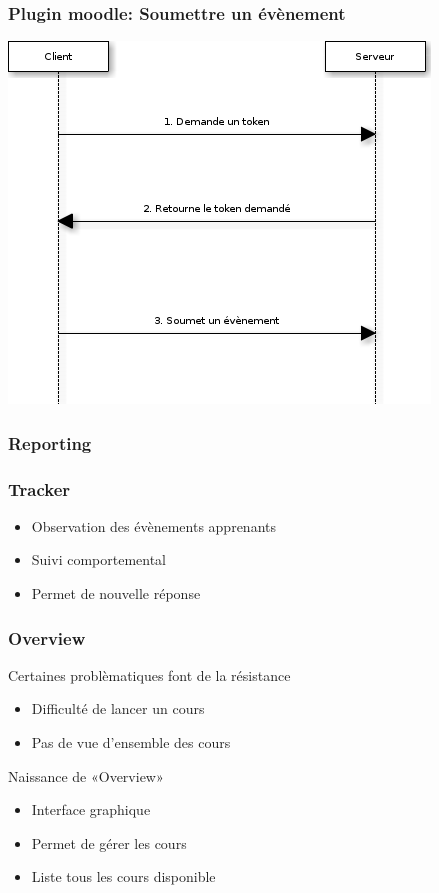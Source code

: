 \documentclass[10pt, compress]{beamer}
\begin{document}
\begin{frame}[fragile]
  \frametitle{Plugin moodle: Soumettre un évènement}
  \begin{center}
    \includegraphics[scale = 0.5]{../french/mem-seq-submit-event.png}
  \end{center}
\end{frame}

\begin{frame}[fragile]
  \frametitle{Reporting}
  \begin{center}

   \end{center}
\end{frame}

\begin{frame}[fragile]
  \frametitle{Tracker}
  \begin{center}
    \begin{itemize}[<+- | alert@+>]
      \item Observation des évènements apprenants
      \item Suivi comportemental
      \item Permet de nouvelle réponse
    \end{itemize}
  \end{center}
\end{frame}

\begin{frame}[fragile]
  \frametitle{Overview}
  \begin{center}
    Certaines problèmatiques font de la résistance
    \pause
    \begin{itemize}[<+- | alert@+>]
      \item Difficulté de lancer un cours
      \item Pas de vue d'ensemble des cours
    \end{itemize}
    \pause
    Naissance de «Overview»
    \pause
    \begin{itemize}[<+- | alert@+>]
      \item Interface graphique
      \item Permet de gérer les cours
      \item Liste tous les cours disponible
    \end{itemize}
  \end{center}
\end{frame}
\end{document}
